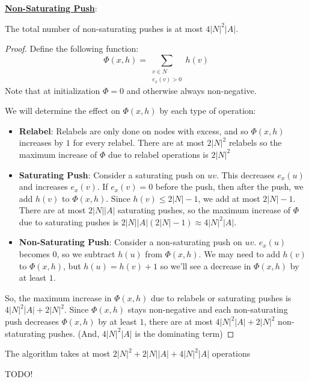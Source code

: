 \underline{\textbf{Non-Saturating Push}}: 
\begin{theorem}{}{}
    The total number of non-saturating pushes is at most $4|N|^2|A|$. 
\end{theorem}
\begin{proof}
    Define the following function:
    \begin{equation*}
        \Phi(x,h) = \sum_{\substack{v \in N \\ e_x(v) > 0}} h(v)
    \end{equation*}
    Note that at initialization $\Phi = 0$ and otherwise always non-negative.

    We will determine the effect on $\Phi(x,h)$ by each type of operation:
    \begin{itemize}
        \item \textbf{Relabel}: Relabels are only done on nodes with excess, and so $\Phi(x,h)$ increases by $1$ for every relabel. There are at most $2|N|^2$ relabels so the maximum increase of $\Phi$ due to relabel operations is $2|N|^2$
        \item \textbf{Saturating Push}: Consider a saturating push on $uv$. This decreases $e_x(u)$ and increases $e_x(v)$. If $e_x(v) = 0$ before the push, then after the push, we add $h(v)$ to $\Phi(x,h)$. Since $h(v) \leq 2|N| - 1$, we add at most $2|N| - 1$. There are at most $2|N||A|$ saturating pushes, so the maximum increase of $\Phi$ due to saturating pushes is $2|N||A|(2|N| - 1) \approx 4|N|^2|A|$.
        \item \textbf{Non-Saturating Push}: Consider a non-saturating push on $uv$. $e_x(u)$ becomes $0$, so we subtract $h(u)$ from $\Phi(x,h)$. We may need to add $h(v)$ to $\Phi(x,h)$, but $h(u) = h(v) + 1$ so we'll see a decrease in $\Phi(x,h)$ by at least $1$.
    \end{itemize}
    
    So, the maximum increase in $\Phi(x,h)$ due to relabels or saturating pushes is $4|N|^2|A| + 2|N|^2$. Since $\Phi(x,h)$ stays non-negative and each non-saturating push decreases $\Phi(x,h)$ by at least $1$, there are at most $4|N|^2|A| + 2|N|^2$ non-staturating pushes. (And, $4|N|^2|A|$ is the dominating term)
\end{proof}

\begin{corollary}{}{}
    The algorithm takes at most $2|N|^2 + 2|N||A| + 4|N|^2|A|$ operations
\end{corollary}

\begin{example}{}{}
    TODO!
\end{example}
